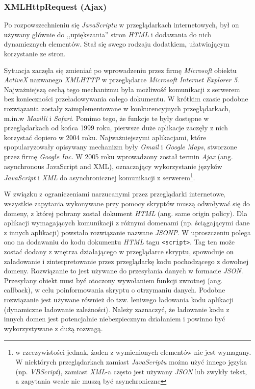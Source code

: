 \documentclass[a4paper,12pt]{article}
\begin{document}
\subsubsection{XMLHttpRequest (Ajax)}
Po rozpowszechnieniu się \emph{JavaScriptu} w przeglądarkach
internetowych, był on używany głównie do ,,upiększania'' stron
\emph{HTML} i dodawania do nich dynamicznych elementów. Stał się swego
rodzaju dodatkiem, ułatwiającym korzystanie ze stron.

Sytuacja zaczęła się zmieniać po wprowadzeniu przez firmę
\emph{Microsoft} obiektu \emph{ActiveX} nazwanego \emph{XMLHTTP} w
przeglądarce \emph{Microsoft Internet Explorer 5}. Najważniejszą cechą
tego mechanizmu była możliwość komunikacji z serwerem bez konieczności
przeładowywania całego dokumentu. W krótkim czasie podobne rozwiązania
zostały zaimplementowane w konkurencyjnych przeglądarkach, m.in.w
\emph{Mozilli} i \emph{Safari}. Pomimo tego, że funkcje te były
dostępne w przeglądarkach od końca 1999 roku, pierwsze duże aplikacje
zaczęły z nich korzystać dopiero w 2004 roku. Najważniejszymi
aplikacjami, które spopularyzowały opisywany mechanizm były
\emph{Gmail} i \emph{Google Maps}, stworzone przez firmę \emph{Google
  Inc.} W 2005 roku wprowadzony został termin \emph{Ajax}
(ang. asynchronous JavaScript and XML), oznaczający wykorzystanie
języków \emph{JavaScript} i \emph{XML} do asynchronicznej komunikacji
z serwerem\footnote{w rzeczywistości jednak, żaden z wymienionych
  elementów nie jest wymagany. W niektórych przeglądarkach zamiast
  \emph{JavaScriptu} można użyć innego języka (np. \emph{VBScript}),
  zamiast \emph{XML}-a często jest używany \emph{JSON} lub zwykły
  tekst, a zapytania wcale nie muszą być asynchroniczne\cite{ajax}}.

W związku z ograniczeniami narzucanymi przez przeglądarki internetowe,
wszystkie zapytania wykonywane przy pomocy skryptów muszą odwoływać
się do domeny, z której pobrany został dokument \emph{HTML} (ang. same
origin policy\cite{origin}). Dla aplikacji wymagających komunikacji z
różnymi domenami (np. ściągającymi dane z innych aplikacji) powstało
rozwiązanie nazwane \emph{JSONP}. W uproszczeniu polega ono na
dodawaniu do kodu dokumentu \emph{HTML} tagu \texttt{<script>}. Tag
ten może zostać dodany z wnętrza działającego w przeglądarce skryptu,
spowoduje on załadowanie i zinterpretowanie przez przeglądarkę kodu
pochodzącego z dowolnej domeny\cite{json}. Rozwiązanie to jest używane
do przesyłania danych w formacie \emph{JSON}. Przesyłany obiekt musi
być otoczony wywołaniem funkcji zwrotnej (ang. callback), w celu
poinformowania skryptu o otrzymaniu danych. Podobne rozwiązanie jest
używane również do tzw. leniwego ładowania kodu aplikacji (dynamiczne
ładowanie zależności). Należy zaznaczyć, że ładowanie kodu z innych
domen jest potencjalnie niebezpiecznym działaniem i powinno być
wykorzystywane z dużą rozwagą.
\end{document}
